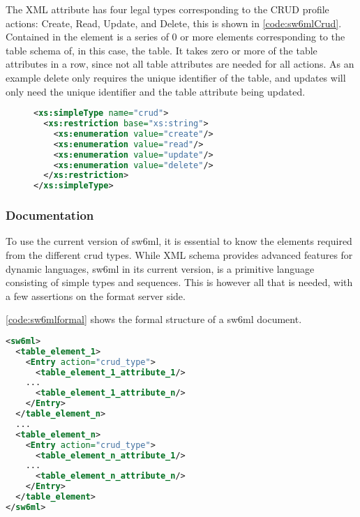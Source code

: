 The  XML attribute has four legal types corresponding to the CRUD profile actions: Create, Read, Update, and Delete, this is shown in \autoref{code:sw6mlCrud}.
Contained in the   element is a series of 0 or more elements corresponding to the table schema of, in this case, the  table.
It takes zero or more of the table attributes in a row, since not all table attributes are needed for all actions. As an example delete only requires the unique identifier of the table, and
updates will only need the unique identifier and the table attribute being updated.
\begin{figure}[H]
\begin{lstlisting}[label=code:sw6mlCrud,language=XML,caption=sw6ml crud simple type]
 <xs:simpleType name="crud">
  <xs:restriction base="xs:string">
    <xs:enumeration value="create"/>
    <xs:enumeration value="read"/>
    <xs:enumeration value="update"/>
    <xs:enumeration value="delete"/>
  </xs:restriction>
</xs:simpleType>
\end{lstlisting}
\end{figure}

\subsubsection{Documentation}
\label{sw6mlusage}
To use the current version of sw6ml, it is essential to know the elements required from the different crud types.
While XML schema provides advanced features for dynamic languages, sw6ml in its current version, is a primitive language consisting of simple types and sequences.
This is however all that is needed, with a few assertions on the format server side.

\autoref{code:sw6mlformal} shows the formal structure of a sw6ml document.
\begin{Code}
\begin{lstlisting}[label=code:sw6mlformal,language=XML,caption=Root and table elements]
<sw6ml> 
  <table_element_1>
    <Entry action="crud_type">
      <table_element_1_attribute_1/>
	...
      <table_element_1_attribute_n/>
    </Entry>
  </table_element_n>
  ...
  <table_element_n>
    <Entry action="crud_type">
      <table_element_n_attribute_1/>
	...
      <table_element_n_attribute_n/>
    </Entry>
  </table_element>
</sw6ml>
\end{lstlisting}
\end{Code}


